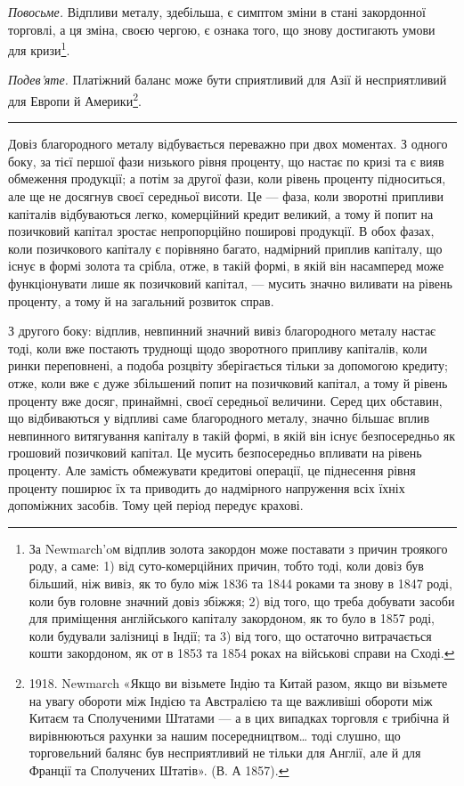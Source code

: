 \emph{Повосьме.} Відпливи металу, здебільша, є симптом зміни в стані закордонної
торговлі, а ця зміна, своєю чергою, є ознака того, що знову достигають
умови для кризи\footnote{
За Newmarch’oм відплив золота закордон може поставати з причин троякого роду, а саме:
1) від суто-комерційних причин, тобто тоді, коли довіз був більший, ніж вивіз, як то було між 1836
та 1844 роками та знову в 1847 роді, коли був головне значний довіз збіжжя; 2) від того, що треба
добувати засоби для приміщення англійського капіталу закордоном, як то було в 1857 роді, коли
будували
залізниці в Індії; та 3) від того, що остаточно витрачається кошти закордоном, як от в 1853
та 1854 роках на військові справи на Сході.
}.

\emph{Подев’яте.} Платіжний баланс може бути сприятливий для Азії й несприятливий
для Европи й Америки\footnote{
1918. Newmarch «Якщо ви візьмете Індію та Китай разом, якщо ви візьмете на увагу
обороти між Індією та Австралією та ще важливіші обороти між Китаєм та Сполученими Штатами — а в
цих випадках торговля є трибічна й вирівнюються рахунки за нашим посередництвом\dots{} тоді слушно,
що торговельний балянс був несприятливий не тільки для Англії, але й для Франції та Сполучених
Штатів». (В. А 1857).
}.

\pfbreak

Довіз благородного металу відбувається переважно при двох моментах.
З одного боку, за тієї першої фази низького рівня проценту, що настає по
кризі та є вияв обмеження продукції; а потім за другої фази, коли рівень проценту
підноситься, але ще не досягнув своєї середньої висоти. Це — фаза, коли
зворотні припливи капіталів відбуваються легко, комерційний кредит великий,
а тому й попит на позичковий капітал зростає непропорційно поширові продукції.
В обох фазах, коли позичкового капіталу є порівняно багато, надмірний
приплив капіталу, що існує в формі золота та срібла, отже, в такій формі,
в якій він насамперед може функціонувати лише як позичковий капітал, — мусить
значно виливати на рівень проценту, а тому й на загальний розвиток справ.

З другого боку: відплив, невпинний значний вивіз благородного металу
настає тоді, коли вже постають труднощі щодо зворотного припливу капіталів,
коли ринки переповнені, а подоба розцвіту зберігається тільки за допомогою
кредиту; отже, коли вже є дуже збільшений попит на позичковий капітал, а тому
й рівень проценту вже досяг, принаймні, своєї середньої величини. Серед цих
обставин, що відбиваються у відпливі саме благородного металу, значно більшає
вплив невпинного витягування капіталу в такій формі, в якій він існує безпосередньо
як грошовий позичковий капітал. Це мусить безпосередньо впливати
на рівень проценту. Але замість обмежувати кредитові операції, це піднесення
рівня проценту поширює їх та приводить до надмірного напруження всіх їхніх
допоміжних засобів. Тому цей період передує крахові.

